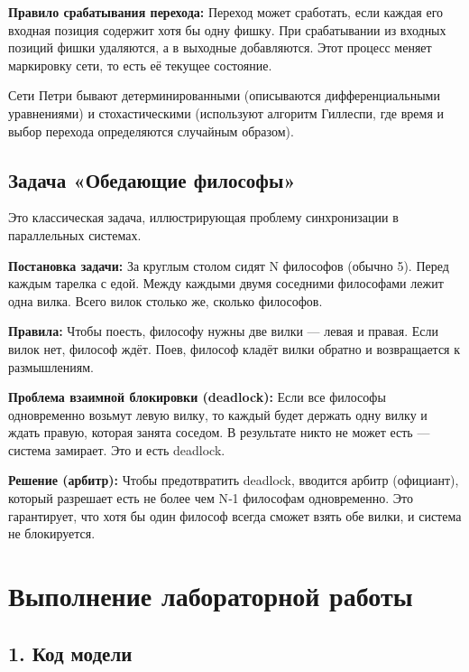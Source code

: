 \documentclass[
  12pt,
  a4paper,
  DIV=11,
  numbers=noendperiod]{scrreprt}
\begin{document}
\textbf{Правило срабатывания перехода:} Переход может сработать, если
каждая его входная позиция содержит хотя бы одну фишку. При срабатывании
из входных позиций фишки удаляются, а в выходные добавляются. Этот
процесс меняет маркировку сети, то есть её текущее состояние.

Сети Петри бывают детерминированными (описываются дифференциальными
уравнениями) и стохастическими (используют алгоритм Гиллеспи, где время
и выбор перехода определяются случайным образом).

\section{Задача «Обедающие
философы»}\label{ux437ux430ux434ux430ux447ux430-ux43eux431ux435ux434ux430ux44eux449ux438ux435-ux444ux438ux43bux43eux441ux43eux444ux44b}

Это классическая задача, иллюстрирующая проблему синхронизации в
параллельных системах.

\textbf{Постановка задачи:} За круглым столом сидят N философов (обычно
5). Перед каждым тарелка с едой. Между каждыми двумя соседними
философами лежит одна вилка. Всего вилок столько же, сколько философов.

\textbf{Правила:} Чтобы поесть, философу нужны две вилки --- левая и
правая. Если вилок нет, философ ждёт. Поев, философ кладёт вилки обратно
и возвращается к размышлениям.

\textbf{Проблема взаимной блокировки (deadlock):} Если все философы
одновременно возьмут левую вилку, то каждый будет держать одну вилку и
ждать правую, которая занята соседом. В результате никто не может есть
--- система замирает. Это и есть deadlock.

\textbf{Решение (арбитр):} Чтобы предотвратить deadlock, вводится арбитр
(официант), который разрешает есть не более чем N‑1 философам
одновременно. Это гарантирует, что хотя бы один философ всегда сможет
взять обе вилки, и система не блокируется.

\chapter{Выполнение лабораторной
работы}\label{ux432ux44bux43fux43eux43bux43dux435ux43dux438ux435-ux43bux430ux431ux43eux440ux430ux442ux43eux440ux43dux43eux439-ux440ux430ux431ux43eux442ux44b}

\section{1. Код
модели}\label{ux43aux43eux434-ux43cux43eux434ux435ux43bux438}
\end{document}
